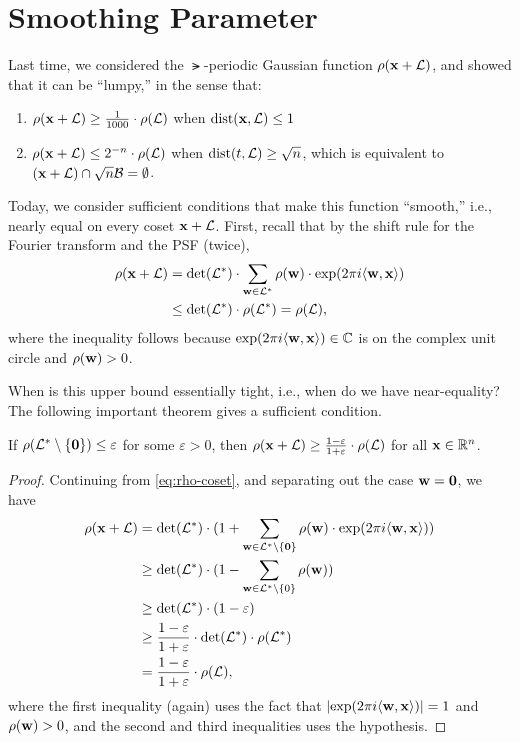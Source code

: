 \documentclass[11pt]{article}
\begin{document}
\section{Smoothing Parameter}
\label{sec:smoothing-parameter}

Last time, we considered the $\lat$-periodic Gaussian function
$\rho(\mathbf{x}+\mathcal{L})$, and showed that it can be ``lumpy,'' in the sense
that:
\begin{enumerate}
\item $\rho(\mathbf{x}+\mathcal{L}) \geq \frac{1}{1000} \cdot \rho(\mathcal{L})$ when
  $\operatorname{dist}(\mathbf{x},\mathcal{L}) \leq 1$
\item $\rho(\mathbf{x}+\mathcal{L}) \leq 2^{-n} \cdot \rho(\mathcal{L})$ when
  $\operatorname{dist}(t,\mathcal{L}) \geq \sqrt{n}$, which is equivalent to
  $(\mathbf{x}+\mathcal{L}) \cap \sqrt{n} \mathcal{B} = \emptyset$.
\end{enumerate}

Today, we consider sufficient conditions that make this function
``smooth,'' i.e., nearly equal on every coset $\mathbf{x}+\mathcal{L}$. First,
recall that by the shift rule for the Fourier transform and the PSF
(twice),
\begin{align}
  \rho(\mathbf{x}+\mathcal{L}) 
  &= \det(\mathcal{L}^*) \cdot \sum_{\mathbf{w} \in
    \mathcal{L}^*} \rho(\mathbf{w}) \cdot \exp(2\pi i \langle\mathbf{w},\mathbf{x}\rangle)
    \label{eq:rho-coset} \\
  &\leq \det(\mathcal{L}^*) \cdot \rho(\mathcal{L}^{*}) = \rho(\mathcal{L}), \nonumber
\end{align}  
where the inequality follows because
$\exp(2\pi i \langle\mathbf{w},\mathbf{x}\rangle) \in \mathbb{C}$ is on the complex unit
circle and $\rho(\mathbf{w}) > 0$.

When is this upper bound essentially tight, i.e., when do we have
near-equality? The following important theorem gives a sufficient
condition.

\begin{theorem}
  \label{thm:smooth}
  If $\rho(\mathcal{L}^* \setminus \{\mathbf{0}\}) \leq \varepsilon$ for some
  $\varepsilon > 0$, then
  $\rho(\mathbf{x} + \mathcal{L}) \geq \frac{1-\varepsilon}{1+\varepsilon} \cdot
  \rho(\mathcal{L})$ for all $\mathbf{x} \in \mathbb{R}^{n}$.
\end{theorem}

\begin{proof}
  Continuing from \cref{eq:rho-coset}, and separating out the case
  $\mathbf{w}=\mathbf{0}$, we have
  \begin{align*}
    \rho(\mathbf{x}+\mathcal{L}) 
    &= \det(\mathcal{L}^*) \cdot (1 + \sum_{\mathbf{w} \in \mathcal{L}^*
      \setminus \{\mathbf{0}\}} \rho(\mathbf{w}) \cdot \exp(2\pi i
      \langle\mathbf{w},\mathbf{x}\rangle)) \\
    &\geq \det(\mathcal{L}^{*}) \cdot (1 - \sum_{\mathbf{w} \in \mathcal{L}^{*} \setminus
      \{0\}} \rho(\mathbf{w})) \\
    &\geq \det(\mathcal{L}^{*}) \cdot (1-\varepsilon) \\
    &\geq \frac{1-\varepsilon}{1+\varepsilon} \cdot \det(\mathcal{L}^{*}) \cdot
      \rho(\mathcal{L}^{*}) \\
    &= \frac{1-\varepsilon}{1+\varepsilon} \cdot \rho(\mathcal{L}),
  \end{align*} 
  where the first inequality (again) uses the fact that
  $\lvert\exp(2 \pi i \langle\mathbf{w},\mathbf{x}\rangle)\rvert = 1$ and $\rho(\mathbf{w}) > 0$,
  and the second and third inequalities uses the hypothesis.
\end{proof}
\end{document}
